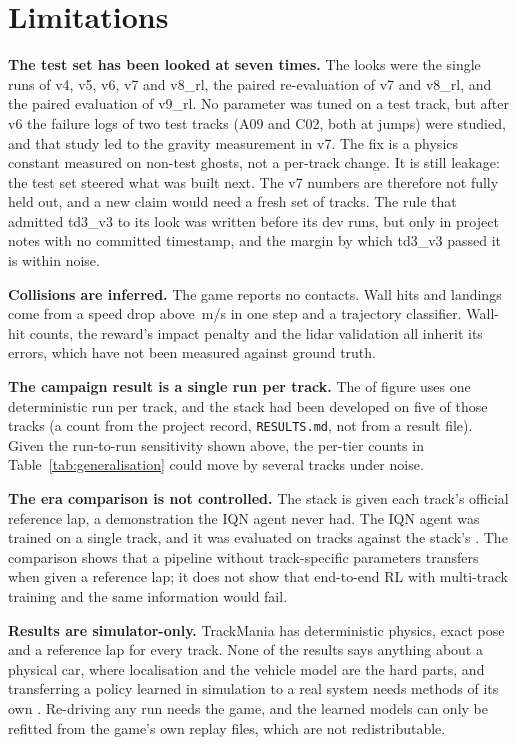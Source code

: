 \documentclass[conference]{IEEEtran}
\newcommand{\vseven}{v7\xspace}
\newcommand{\veight}{v8\_rl\xspace}
\newcommand{\vnine}{v9\_rl\xspace}
\begin{document}
\section{Limitations}
\label{sec:limitations}

\textbf{The test set has been looked at seven times.} The looks were the single runs of v4, v5, v6, \vseven
and \veight, the paired re-evaluation of \vseven and \veight, and the paired evaluation of \vnine. No
parameter was tuned on a test track, but after v6 the failure logs of two test tracks (A09 and C02, both at
jumps) were studied, and that study led to the gravity measurement in \vseven. The fix is a physics constant
measured on non-test ghosts, not a per-track change. It is still leakage: the test set steered what was
built next. The \vseven numbers are therefore not fully held out, and a new claim would need a fresh set of
tracks. The rule that admitted td3\_v3 to its look was written before its dev runs, but only in project notes with
no committed timestamp, and the margin by which td3\_v3 passed it is within noise.

\textbf{Collisions are inferred.} The game reports no contacts. Wall hits and landings come from a speed
drop above \ImpactDrop\,m/s in one step and a trajectory classifier. Wall-hit counts, the reward's impact
penalty and the lidar validation all inherit its errors, which have not been measured against ground truth.

\textbf{The campaign result is a single run per track.} The \CampaignFin of \CampaignMaps figure uses one
deterministic run per track, and the stack had been developed on five of those tracks (a count from the project record,
\texttt{RESULTS.md}, not from a result file). Given the run-to-run
sensitivity shown above, the per-tier counts in Table~\ref{tab:generalisation} could move by several tracks
under noise.

\textbf{The era comparison is not controlled.} The stack is given each track's official reference lap,
a demonstration the IQN agent never had. The IQN agent was trained on a single track, and it was evaluated
on \IQNOtherMaps tracks against the stack's \CampaignMaps. The comparison shows that a pipeline without
track-specific parameters transfers when given a reference lap; it does not show that end-to-end RL with
multi-track training and the same information would fail.

\textbf{Results are simulator-only.} TrackMania has deterministic physics, exact pose and a reference lap for
every track. None of the results says anything about a physical car, where localisation and the vehicle model
are the hard parts, and transferring a policy learned in simulation to a real system needs methods of its
own \cite{tobin2017domain}. Re-driving any run needs the game, and the learned models can only
be refitted from the game's own replay files, which are not redistributable.
\end{document}
